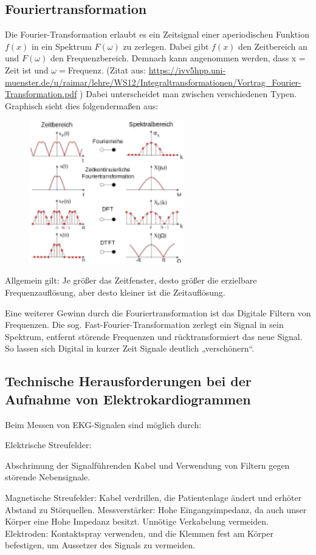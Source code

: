 \subsection{Fouriertransformation }
Die Fourier-Transformation erlaubt es ein Zeitsignal einer aperiodischen Funktion $f(x)$ in ein Spektrum $F(\omega)$ zu zerlegen. Dabei gibt $f(x)$ den Zeitbereich an und $F(\omega)$ den Frequenzbereich. Demnach kann angenommen werden, dass x = Zeit ist und $\omega= $Frequenz. 
(Zitat aus: \url{https://ivv5hpp.uni-muenster.de/u/raimar/lehre/WS12/Integraltransformationen/Vortrag_Fourier-Transformation.pdf} )
Dabei unterscheidet man zwischen verschiedenen Typen. Graphisch sieht dies folgendermaßen aus:
\begin{figure}[H]
     \centering
     \includegraphics[width=0.6\textwidth]{Abb/fourier.pdf}
\end{figure}
Allgemein gilt: Je größer das Zeitfenster, desto größer die erzielbare Frequenzauflösung, aber desto kleiner ist die Zeitauflösung.

Eine weiterer Gewinn durch die Fouriertransformation ist das Digitale Filtern von Frequenzen. Die sog. Fast-Fourier-Transformation zerlegt ein Signal in sein Spektrum, entfernt störende Frequenzen und rücktransformiert das neue Signal. So lassen sich Digital in kurzer Zeit Signale deutlich „verschönern“.

\subsection{Technische Herausforderungen bei der Aufnahme von Elektrokardiogrammen}
Beim Messen von EKG-Signalen sind möglich durch:

Elektrische Streufelder:

Abschrimung der Signalführenden Kabel und Verwendung von Filtern gegen störende Nebensignale.

Magnetische Streufelder:
     Kabel verdrillen, die Patientenlage ändert und erhöter Abstand zu Störquellen.
Messverstärker:
Hohe Eingangsimpedanz, da auch unser Körper eine Hohe Impedanz besitzt. Unnötige Verkabelung vermeiden.
Elektroden:
Kontaktspray verwenden, und die Klemmen fest am Körper befestigen, um Aussetzer des Signals zu vermeiden.